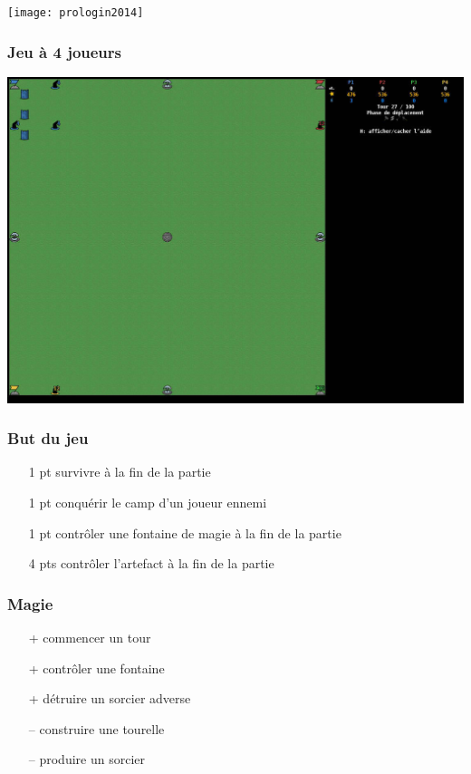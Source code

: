 \documentclass{beamer}
\author[Prologin]
{\texttt{[image: prologin2014]}}
\date
{}
\begin{document}


\begin{frame}
	\vspace{0.5cm} \centering \texttt{[image: prologin2014]}
\end{frame}


\begin{frame}
	\frametitle{Jeu à 4 joueurs}
	\includegraphics[width=\linewidth]{gui.jpg}
\end{frame}

\begin{frame}
	\frametitle{But du jeu}
	\begin{itemize}
	\item[1 pt] survivre à la fin de la partie
	\item[1 pt] conquérir le camp d'un joueur ennemi
	\item[1 pt] contrôler une fontaine de magie à la fin de la partie
	\item[4 pts] contrôler l'artefact à la fin de la partie
	\end{itemize}
\end{frame}

\begin{frame}
	\frametitle{Magie}
	\begin{itemize}
	\item[+] commencer un tour
	\item[+] contrôler une fontaine
	\item[+] détruire un sorcier adverse
	\item[\alert{--}] construire une tourelle
	\item[\alert{--}] produire un sorcier
	\end{itemize}
\end{frame}
\end{document}
